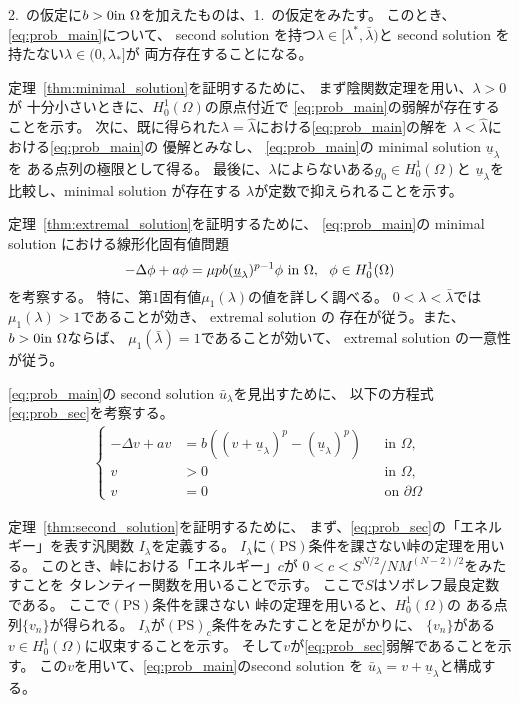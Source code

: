 2.~の仮定に$b > 0 \text{in}~ \Omega$を加えたものは、1.~の仮定をみたす。
このとき、\ref{eq:prob_main}について、
second solution を持つ$\lambda \in [\lambda^*, \bar{\lambda})$と
second solution を持たない$\lambda \in (0, \lambda_*]$が
両方存在することになる。

定理~\ref{thm:minimal_solution}を証明するために、
まず陰関数定理を用い、$\lambda > 0$が
十分小さいときに、$H_0^1(\Omega)$の原点付近で
\ref{eq:prob_main}の弱解が存在することを示す。
次に、既に得られた$\lambda = \hat{\lambda}$における\ref{eq:prob_main}の解を
$\lambda < \hat{\lambda}$における\ref{eq:prob_main}の
優解とみなし、
\ref{eq:prob_main}の minimal solution $\underline{u}_\lambda$を
ある点列の極限として得る。
最後に、$\lambda$によらないある$g_0 \in H_0^1(\Omega)$と
$\underline{u}_\lambda$を比較し、minimal solution が存在する
$\lambda$が定数で抑えられることを示す。

定理~\ref{thm:extremal_solution}を証明するために、
\ref{eq:prob_main}の minimal solution における線形化固有値問題
\[
-\Delta \phi + a \phi = \mu p b (\underline{u}_\lambda)^{p-1} \phi
  ~\text{in}~ \Omega, \ \ \phi \in H_0^1(\Omega)
\] 
を考察する。
特に、第$1$固有値$\mu_1(\lambda)$の値を詳しく調べる。
$0 < \lambda < \bar{\lambda}$では
$\mu_1(\lambda) > 1$であることが効き、
extremal solution の
存在が従う。また、$b > 0 \text{in}~ \Omega$ならば、
$\mu_1(\bar{\lambda}) = 1$であることが効いて、
extremal solution の一意性が従う。

\ref{eq:prob_main}の second solution
$\bar{u}_\lambda$を見出すために、
以下の方程式\ref{eq:prob_sec}を考察する。
\begin{align}
 \left\{
 \begin{aligned}
   -\Delta v + a v &= b \left( (v + \underline{u}_\lambda)^p -
  (\underline{u}_\lambda)^p \right) 
  & &\text{in~} \Omega, \\
  v &> 0 & &\text{in~} \Omega, \\
  v &= 0 & &\text{on~} \partial\Omega
 \end{aligned}
 \right. \tag*{$(\heartsuit)_\lambda$} \label{eq:prob_sec}
\end{align}

定理~\ref{thm:second_solution}を証明するために、
まず、\ref{eq:prob_sec}の「エネルギー」を表す汎関数
$I_\lambda$を定義する。
$I_\lambda$に$(\mathrm{PS})$条件を課さない峠の定理を用いる。
このとき、峠における「エネルギー」$c$が
$0 < c < S^{N/2} / NM^{(N-2)/2}$をみたすことを
タレンティー関数を用いることで示す。
ここで$S$はソボレフ最良定数である。
ここで$(\mathrm{PS})$条件を課さない
峠の定理を用いると、$H_0^1(\Omega)$の
ある点列$\{ v_n \}$が得られる。
$I_\lambda$が$(\mathrm{PS})_c$条件をみたすことを足がかりに、
$\{ v_n \}$がある$v \in H_0^1(\Omega)$に収束することを示す。
そして$v$が\ref{eq:prob_sec}弱解であることを示す。
この$v$を用いて、\ref{eq:prob_main}のsecond solution を
$\bar{u}_\lambda = v + \underline{u}_\lambda$と構成する。


